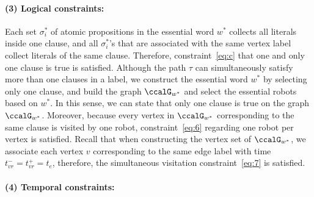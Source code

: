 \documentclass[Afour,sageh,times]{sagej}
\begin{document}
{{\paragraph{(3) Logical constraints:} Each set $\sigma^*_i$ of atomic propositions in the essential word $w^*$ collects all literals inside one clause, and all $\sigma^*_i$'s that are associated with the same vertex label collect literals of the same clause. Therefore, constraint~\eqref{eq:c} that one and only one clause is true is satisfied. Although the path $\tau$ can simultaneously satisfy more than one clauses in a label, we construct the essential word $w^*$ by selecting only one clause, and build the graph $\ccalG_{w^*}$ and select the essential robots based on $w^*$. In this sense, we can state that only one clause is true on the graph $\ccalG_{w^*}$. Moreover, because every vertex in $\ccalG_{w^*}$ corresponding to the same clause is visited by one robot, constraint~\eqref{eq:6} regarding one robot per vertex is satisfied. Recall that when constructing the vertex set of $\ccalG_{w^*}$, we associate each vertex $v$ corresponding to the same edge label with time $t_{vr}^- = t_{vr}^+ = t_e$, therefore, the simultaneous visitation constraint~\eqref{eq:7} is satisfied.

\paragraph{(4) Temporal constraints:}
}}
\end{document}
